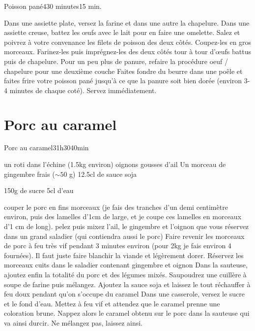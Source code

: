 {\begin{recette}{Poisson pané}{4}{30 minutes}{15 min.}
\begin{preparation}
\etape Dans une assiette plate, versez la farine et dans une autre la chapelure. Dans une assiette creuse, battez les œufs avec le lait pour en faire une omelette.
\etape Salez et poivrez à votre convenance les filets de poisson des deux côtés. Coupez-les en gros morceaux. Farinez-les puis imprégnez-les des deux côtés tour à tour d'œufs battus puis de chapelure.
\etape [optionnel] Pour un peu plus de panure, refaire la procédure oeuf / chapelure pour une deuxième couche
\etape Faites fondre du beurre dans une poêle et faites frire votre poisson pané jusqu'à ce que la panure soit bien dorée (environ 3-4 minutes de chaque coté). Servez immédiatement.
\end{preparation}
\end{recette}


\section{Porc au caramel}
\begin{recette}{Porc au caramel}{3}{1h30}{40min}
\begin{ingredients}
\ingredient un roti dans l'échine (1.5kg environ)
 oignons
 gousses d'ail
\ingredient Un morceau de gingembre frais ($\sim 50$ g)
\ingredient 12.5cl de sauce soja

\ingredient 150g de sucre
\ingredient 5cl d'eau
\end{ingredients}

\begin{preparation}
\etape couper le porc en fins morceaux (je fais des tranches d'un demi centimètre environ, puis des lamelles d'1cm de large, et
je coupe ces lamelles en morceaux d'1 cm de long).
\etape pelez puis mixez l'ail, le gingembre et l'oignon que vous réservez dans un grand saladier (qui contiendra aussi le porc)
\etape Faire revenir les morceaux de porc à feu très vif pendant 3 minutes environ (pour 2kg je fais environ 4 fournées). Il
faut juste faire blanchir la viande et légèrement dorer. Réservez les morceaux cuits dans le saladier contenant gingembre et
oignon
\etape Dans la sauteuse, ajoutez enfin la totalité du porc et des légumes mixés. 
\etape Saupoudrez une cuillère à soupe de farine puis mélangez. 
\etape Ajoutez la sauce soja et laissez le tout réchauffer à feu doux pendant qu'on s'occupe du caramel
\etape Dans une casserole, versez le sucre et le fond d'eau. Mettez à feu vif et attendez que le caramel prenne une coloration
brune.
\etape Nappez alors le caramel obtenu sur le porc dans la sauteuse qui va ainsi durcir. Ne mélangez pas, laissez ainsi.
\end{preparation}


\end{recette}}
